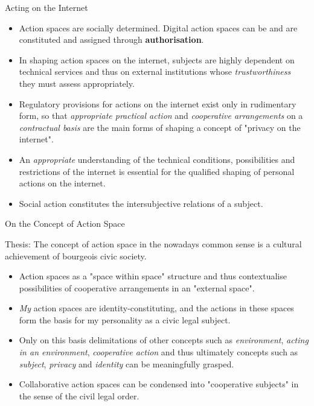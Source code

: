 \documentclass{beamer}
\begin{document}
\begin{frame}{Acting on the Internet}\small
\begin{itemize}
\item Action spaces are socially determined. Digital action spaces can be and
  are constituted and assigned through \textbf{authorisation}.
\item In shaping action spaces on the internet, subjects are highly dependent
  on technical services and thus on external institutions whose
  \emph{trustworthiness} they must assess appropriately.
\item Regulatory provisions for actions on the internet exist only in
  rudimentary form, so that \emph{appropriate practical action} and
  \emph{cooperative arrangements} on a \emph{contractual basis} are the main
  forms of shaping a concept of "privacy on the internet".
\item An \emph{appropriate} understanding of the technical conditions,
  possibilities and restrictions of the internet is essential for the
  qualified shaping of personal actions on the internet.
\item Social action constitutes the intersubjective relations of a subject.
\end{itemize}
\end{frame}
\begin{frame}{On the Concept of Action Space}
  \begin{block}{Thesis:}
    The concept of action space in the nowadays common sense is a cultural
    achievement of bourgeois civic society.
  \end{block}\small
\begin{itemize}
\item Action spaces as a "space within space" structure and thus contextualise
  possibilities of cooperative arrangements in an "external space".
\item \emph{My} action spaces are identity-constituting, and the actions in
  these spaces form the basis for my personality as a civic legal subject.
\item Only on this basis delimitations of other concepts such as
  \emph{environment}, \emph{acting in an environment}, \emph{cooperative
    action} and thus ultimately concepts such as \emph{subject},
  \emph{privacy} and \emph{identity} can be meaningfully grasped.
\item Collaborative action spaces can be condensed into "cooperative subjects"
  in the sense of the civil legal order.
\end{itemize}
\end{frame}
\end{document}
